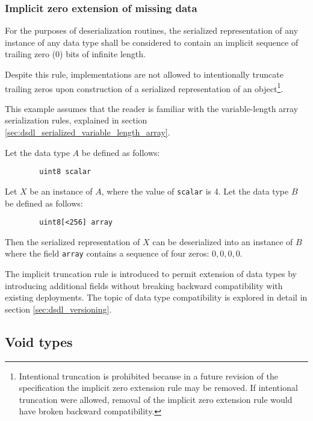 \subsubsection{Implicit zero extension of missing data}

For the purposes of deserialization routines,
the serialized representation of any instance of any data type shall be considered to contain an implicit
sequence of trailing zero (0) bits of infinite length.

Despite this rule, implementations are not allowed to intentionally truncate trailing zeros
upon construction of a serialized representation of an object\footnote{%
    Intentional truncation is prohibited because in a future revision of the specification the implicit zero
    extension rule may be removed.
    If intentional truncation were allowed, removal of the implicit zero extension rule would have
    broken backward compatibility.
}.

\begin{remark}
    This example assumes that the reader is familiar with the variable-length array serialization rules,
    explained in section \ref{sec:dsdl_serialized_variable_length_array}.

    Let the data type $A$ be defined as follows:

    \begin{verbatim}
        uint8 scalar
    \end{verbatim}

    Let $X$ be an instance of $A$, where the value of \verb|scalar| is 4.
    Let the data type $B$ be defined as follows:

    \begin{verbatim}
        uint8[<256] array
    \end{verbatim}

    Then the serialized representation of $X$ can be deserialized into an instance of $B$ where the field
    \verb|array| contains a sequence of four zeros: $0, 0, 0, 0$.

    The implicit truncation rule is introduced to permit extension of data types by introducing additional fields
    without breaking backward compatibility with existing deployments.
    The topic of data type compatibility is explored in detail in section \ref{sec:dsdl_versioning}.
\end{remark}

\subsection{Void types}\label{sec:dsdl_serialized_void}

